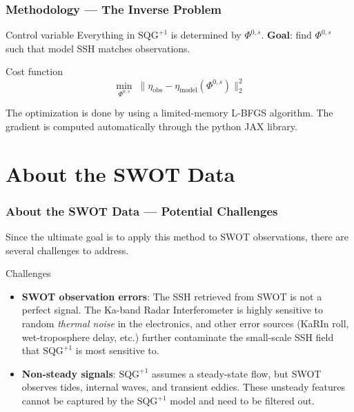 \documentclass[
	11pt, %
]{beamer}
\newcommand{\SQGp}{$\text{SQG}^{+1}$}
\begin{document}
\begin{frame}
    \frametitle{Methodology --- The Inverse Problem}
    \begin{block}{Control variable}
        Everything in \SQGp{} is determined by $\Phi^{0,s}$. \textbf{Goal}: find $\Phi^{0,s}$ such that model SSH matches observations.
    \end{block}
    \begin{block}{Cost function}
        \vspace{-0.5em}
        \begin{equation}
            \min_{\Phi^{0,s}}\; \bigl\| \eta_{\mathrm{obs}} - \eta_{\mathrm{model}}(\Phi^{0,s}) \bigr\|_2^2
        \end{equation}
    \end{block}
    The optimization is done by using a limited-memory L-BFGS algorithm. The gradient is computed automatically through the python JAX library. 
\end{frame}


\section{About the SWOT Data}

\begin{frame}
    \frametitle{About the SWOT Data --- Potential Challenges}
    Since the ultimate goal is to apply this method to SWOT observations, there are several challenges to address.
    \begin{alertblock}{Challenges}
        \begin{itemize}
            \item \textbf{SWOT observation errors}: The SSH retrieved from SWOT is not a perfect signal. The Ka-band Radar Interferometer is highly sensitive to random \emph{thermal noise} in the electronics, and other error sources (KaRIn roll, wet-troposphere delay, etc.) further contaminate the small-scale SSH field that \SQGp{} is most sensitive to. \cite{chelton2022}
            \item \textbf{Non-steady signals}: \SQGp{} assumes a steady-state flow, but SWOT observes tides, internal waves, and transient eddies. These unsteady features cannot be captured by the \SQGp{} model and need to be filtered out.
        \end{itemize}
    \end{alertblock}
\end{frame}
\end{document}
